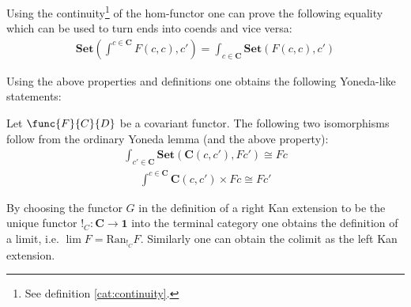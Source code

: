 	\begin{property}
		Using the continuity\footnote{See definition \ref{cat:continuity}.} of the hom-functor one can prove the following equality which can be used to turn ends into coends and vice versa:
		\begin{gather}
			\mathbf{Set}\left(\int^{c\in\mathbf{C}}F(c, c), c'\right) = \int_{c\in\mathbf{C}}\mathbf{Set}\left(F(c, c), c'\right)
		\end{gather}
	\end{property}
	
	Using the above properties and definitions one obtains the following Yoneda-like statements:
	\begin{theorem}
		Let $\func{F}{C}{D}$ be a covariant functor. The following two isomorphisms follow from the ordinary Yoneda lemma (and the above property):
		\begin{gather}
			\int_{c'\in\mathbf{C}}\mathbf{Set}\left(\mathbf{C}(c, c'), Fc'\right)\cong Fc
		\end{gather}
		\begin{gather}
			\int^{c\in\mathbf{C}}\mathbf{C}(c, c')\times Fc\cong Fc'
		\end{gather}
	\end{theorem}
	
	\begin{example}[Limit]
		By choosing the functor $G$ in the definition of a right Kan extension to be the unique functor $!_C:\mathbf{C}\rightarrow\mathbf{1}$ into the terminal category one obtains the definition of a limit, i.e. $\lim F = \text{Ran}_{!_C}F$. Similarly one can obtain the colimit as the left Kan extension.
	\end{example}
	

